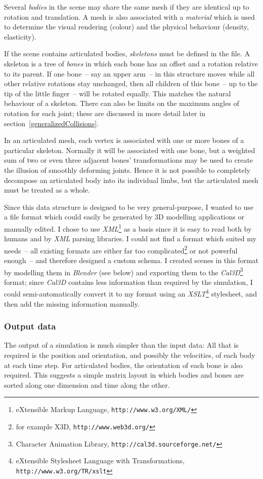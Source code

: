 Several \emph{bodies} in the scene may share the same mesh if they are identical up to rotation
and translation. A mesh is also associated with a \emph{material} which is used to determine the
visual rendering (colour) and the physical behaviour (density, elasticity).

If the scene contains articulated bodies, \emph{skeletons} must be defined in the file. A skeleton
is a tree of \emph{bones} in which each bone has an offset and a rotation relative to its parent.
If one bone~-- say an upper arm~-- in this structure moves while all other relative rotations stay
unchanged, then all children of this bone~-- up to the tip of the little finger~-- will be rotated
equally. This matches the natural behaviour of a skeleton. There can also be limits on the maximum
angles of rotation for each joint; these are discussed in more detail later in
section~\ref{generalizedCollisions}.

In an articulated mesh, each vertex is associated with one or more bones of a particular skeleton.
Normally it will be associated with one bone, but a weighted sum of two or even three adjacent
bones' transformations may be used to create the illusion of smoothly deforming joints. Hence it
is not possible to completely decompose an articulated body into its individual limbs, but the
articulated mesh must be treated as a whole.

Since this data structure is designed to be very general-purpose, I wanted to use a file format
which could easily be generated by 3D modelling applications or manually edited. I chose to use
\textsl{XML}\footnote{eXtensible Markup Language, \texttt{http://www.w3.org/XML/}} as a basis
since it is easy to read both by humans and by \textsl{XML} parsing libraries. I could not
find a format which suited my needs~-- all existing formats are either far too
complicated\footnote{for example X3D, \texttt{http://www.web3d.org/}} or not
powerful enough~-- and therefore designed a custom schema. I created scenes in this format by
modelling them in \textsl{Blender} (see below) and exporting them to the
\textsl{Cal3D}\footnote{Character Animation Library, \texttt{http://cal3d.sourceforge.net/}}
format; since \textsl{Cal3D} contains less information than required by the simulation, I could
semi-automatically convert it to my format using an
\textsl{XSLT}\footnote{eXtensible Stylesheet Language with Transformations,
\texttt{http://www.w3.org/TR/xslt}} stylesheet, and then add the missing information manually.

\subsubsection{Output data}
The output of a simulation is much simpler than the input data: All that is required is the
position and orientation, and possibly the velocities, of each body at each time step. For
articulated bodies, the orientation of each bone is also required. This suggests a simple
matrix layout in which bodies and bones are sorted along one dimension and time along
the other.

